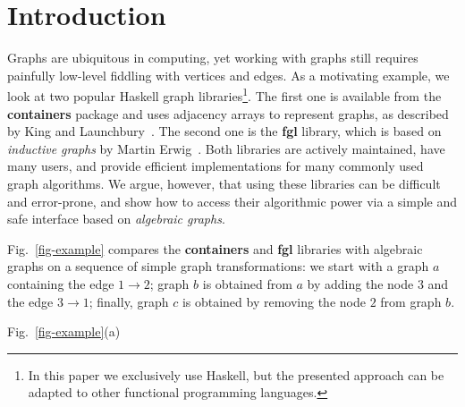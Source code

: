 \documentclass[acmlarge,anonymous]{acmart}\settopmatter{printfolios=true}
\begin{document}
\maketitle

\section{Introduction}

Graphs are ubiquitous in computing, yet working with graphs still requires
painfully low-level fiddling with vertices and edges. As a motivating
example, we look at two popular Haskell graph libraries\footnote{In this paper
we exclusively use Haskell, but the presented approach can be adapted to
other functional programming languages.}. The first one is available from the
\textbf{\textsf{containers}} package and uses adjacency arrays to represent graphs,
as described by King and Launchbury~\citeyear{1995_king_graphs}. The second one
is the \textbf{\textsf{fgl}} library, which is based on \emph{inductive graphs}
by Martin Erwig~\citeyear{2001_erwig_inductive}. Both libraries are
actively maintained, have many users, and provide efficient implementations for
many commonly used graph algorithms. We argue, however, that using these libraries
can be difficult and error-prone, and show how to access their algorithmic power via
a simple and safe interface based on \emph{algebraic graphs}.

Fig.~\ref{fig-example} compares the \textbf{\textsf{containers}} and
\textbf{\textsf{fgl}} libraries with algebraic graphs on a sequence of
simple graph transformations: we start with a graph $a$ containing the
edge $1 \rightarrow 2$; graph $b$ is obtained from $a$ by adding the node $3$
and the edge $3 \rightarrow 1$; finally, graph $c$ is obtained by removing the
node $2$ from graph $b$.

Fig.~\ref{fig-example}(a)
\end{document}
